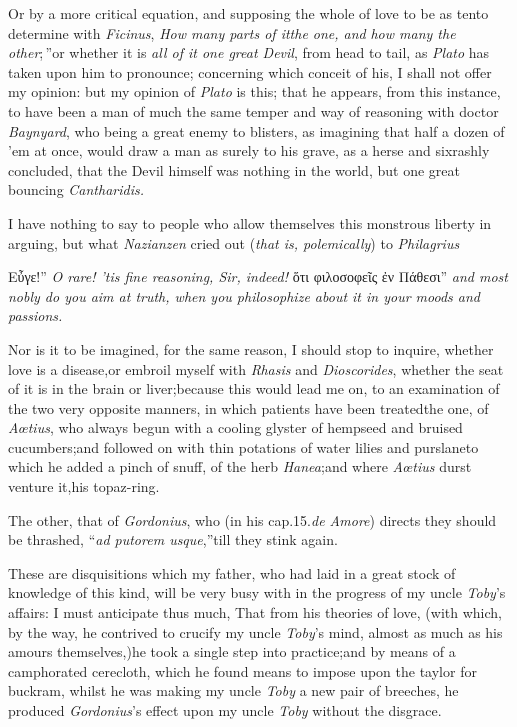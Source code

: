 \documentclass{article}
\begin{document}
\tsh Or by a more critical equation, and supposing the
whole of love to be as ten\tsh to determine with
\textit{Ficinus},\break
\lqq\textit{How many parts of it\tsk the one,\tsk
and}
\lqq \textit{how many the other};\,”\tsk or whether it
is \textit{all of it one great Devil}, from head to tail, as
\textit{Plato} has taken upon him to pronounce; concerning which
conceit of his, I shall not offer my opinion:\break
\tsk but my opinion of \textit{Plato} is this; that
he appears, from this instance, to have been a man of much the same
temper and way of reasoning with doctor \textit{Baynyard}, who being
a great enemy to blisters, as imagining that half a dozen of
’em at once, would draw a man as surely to his grave, as a
herse and six\tsk rashly concluded, that the Devil himself was
nothing in the world, but one great bouncing
\textit{Cantharidis.}\tsh

I have nothing to say to people who allow themselves this
monstrous liberty in arguing, but what \textit{Nazianzen} cried out
(\textit{that is, polemically}) to
\textit{Philagrius}\tsh

\indent\lqq Εὖγε!” \textit{O rare! ’tis fine reasoning, Sir, indeed!}\tsk
\lqq ὅτι φιλοσοφεῖς ἐν Πάθεσι”
\tsk \textit{and most nobly do you aim at truth, when you philosophize about
it in your moods and passions.}

Nor is it to be imagined, for the same reason, I should stop to
inquire, whether love is a disease,\tsh or embroil myself
with \textit{Rhasis} and \textit{Dioscorides}, whether the seat of it
is in the brain or liver;\tsk because this would lead me on, to
an examination of the two very opposite manners, in
which patients have been treated\tsh the one, of
\textit{Aœtius}, who always begun with a cooling glyster of
hempseed and bruised cucumbers;\tsk and followed on with thin
potations of water lilies and purslane\tsk to which he added a
pinch of snuff, of the herb \textit{Hanea};\tsk and where
\textit{Aœtius} durst venture it,\tsk his\break
topaz-ring.

\tsh The other, that of \textit{Gordonius}, who (in his
cap.\@ 15.\@ \textit{de Amore}) directs they should be thrashed,
“\textit{ad putorem usque},”\tsh till they stink
again.

These are disquisitions which my father, who had laid in a great
stock of knowledge of this kind, will be very busy with in the
progress of my uncle\break
\textit{Toby}’s affairs: I must anticipate thus much, That from his theories of
love, (with which, by the way, he contrived to crucify my uncle \textit{Toby}’s
mind, almost as much as his amours themselves,)\tsk he took a single step into
practice;\tsk and by means of a camphorated cerecloth, which he found means to
impose upon the taylor for buckram, whilst he was making my uncle \textit{Toby} a
new pair of breeches, he produced \textit{Gordonius}’s effect upon my uncle
\textit{Toby} without the disgrace.
\end{document}

